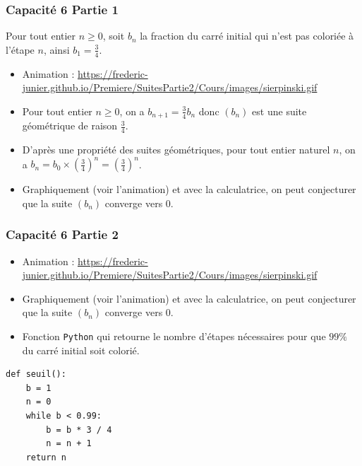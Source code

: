 \documentclass[11pt, hyperref={urlcolor=red,%
            linkcolor=blue, %
            colorlinks=true}]{beamer}
\newcommand{\suite}[1]{\ensuremath{\left(#1_{n}\right)}}
\begin{document}
 






\begin{frame}
\frametitle{Capacité 6 Partie 1}
\label{capacite6}
Pour tout entier $n \geqslant 0$, soit $b_{n}$ la fraction du carré initial qui n'est pas coloriée à l'étape $n$, ainsi $b_{1}=\frac{3}{4}$.
\begin{itemize}
\pause	\item Animation : \href{https://frederic-junier.github.io/Premiere/SuitesPartie2/Cours/images/sierpinski.gif}{https://frederic-junier.github.io/Premiere/SuitesPartie2/Cours/images/sierpinski.gif}
 \pause   \item Pour tout entier $n \geqslant 0$, on a  $b_{n+1}=\frac{3}{4}b_{n}$ donc $\suite{b}$ est une suite géométrique de raison $\frac{3}{4}$.
 \pause   \item D'après une propriété des suites géométriques, pour tout entier naturel $n$, on a $b_{n}=b_{0}\times \left(\frac{3}{4}\right)^{n}=\left(\frac{3}{4}\right)^{n}$.
\pause    \item Graphiquement (voir l'animation) et avec la calculatrice, on peut conjecturer que la suite $\suite{b}$ converge vers $0$.
 
\end{itemize}



\end{frame}



\begin{frame}[fragile]
\frametitle{Capacité 6 Partie 2}

\begin{itemize}
	\item Animation : \href{https://frederic-junier.github.io/Premiere/SuitesPartie2/Cours/images/sierpinski.gif}{https://frederic-junier.github.io/Premiere/SuitesPartie2/Cours/images/sierpinski.gif}
    \item Graphiquement (voir l'animation) et avec la calculatrice, on peut conjecturer que la suite $\suite{b}$ converge vers $0$.
    \item Fonction \texttt{Python} qui retourne le nombre d'étapes nécessaires pour que $99\%$ du carré initial soit colorié.
\end{itemize}


\begin{lstlisting}[style=rond]
def seuil():
	b = 1
	n = 0
	while b < 0.99:
		b = b * 3 / 4
		n = n + 1
	return n
\end{lstlisting}
\end{frame}
\end{document}
